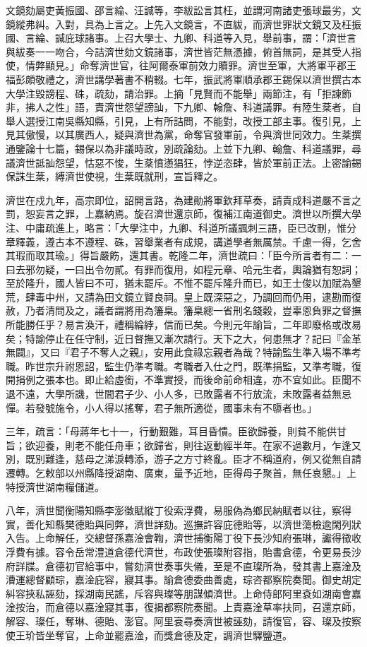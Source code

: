 \begin{pinyinscope}
文鏡劾屬吏黃振國、邵言綸、汪諴等，李紱訟言其枉，並謂河南諸吏張球最劣，文鏡縱弗糾。入對，具為上言之。上先入文鏡言，不直紱，而濟世罪狀文鏡又及枉振國、言綸、諴庇球諸事。上召大學士、九卿、科道等入見，舉前事，謂：「濟世言與紱奏一一吻合，今詰濟世劾文鏡諸事，濟世皆茫無憑據，俯首無詞，是其受人指使，情弊顯見。」命奪濟世官，往阿爾泰軍前效力贖罪。濟世至軍，大將軍平郡王福彭頗敬禮之，濟世講學著書不稍輟。七年，振武將軍順承郡王錫保以濟世撰古本大學注毀謗程、硃，疏劾，請治罪。上摘「見賢而不能舉」兩節注，有「拒諫飾非，拂人之性」語，責濟世怨望謗訕，下九卿、翰詹、科道議罪。有陸生棻者，自舉人選授江南吳縣知縣，引見，上有所詰問，不能對，改授工部主事。復引見，上見其傲慢，以其廣西人，疑與濟世為黨，命奪官發軍前，令與濟世同效力。生棻撰通鑒論十七篇，錫保以為非議時政，別疏論劾。上並下九卿、翰詹、科道議罪，尋議濟世詆訕怨望，怙惡不悛，生棻憤懣猖狂，悖逆恣肆，皆於軍前正法。上密諭錫保誅生棻，縛濟世使視，生棻既就刑，宣旨釋之。

濟世在戍九年，高宗即位，詔開言路，為建勛將軍欽拜草奏，請責成科道嚴不言之罰，恕妄言之罪，上嘉納焉。旋召濟世還京師，復補江南道御史。濟世以所撰大學注、中庸疏進上，略言：「大學注中，九卿、科道所議諷刺三語，臣已改刪，惟分章釋義，遵古本不遵程、硃，習舉業者有成規，講道學者無厲禁。千慮一得，乞舍其瑕而取其瑜。」得旨嚴飭，還其書。乾隆二年，濟世疏曰：「臣今所言者有二：一曰去邪勿疑，一曰出令勿貳。有罪而復用，如程元章、哈元生者，輿論猶有恕詞；至於隆升，國人皆曰不可，猶未罷斥。不惟不罷斥隆升而已，如王士俊以加賦為墾荒，肆毒中州，又請為田文鏡立賢良祠。皇上既深惡之，乃調回而仍用，逮勘而復赦，乃者清問及之，議者謂將用為籓臬。籓臬總一省刑名錢穀，豈辜恩負罪之督撫所能勝任乎？易言渙汗，禮稱綸綍，信而已矣。今則元年諭旨，二年即廢格或改易矣；特諭停止在任守制，近日督撫又漸次請行。天下之大，何患無才？記曰『金革無闢』，又曰『君子不奪人之親』，安用此食祿忘親者為哉？特諭監生準入場不準考職。昨世宗升祔恩詔，監生仍準考職。考職者入仕之門，既準捐監，又準考職，復開捐例之張本也。即止給虛銜，不準實授，而後命前命相違，亦不宜如此。臣聞不退不遠，大學所譏，世間君子少、小人多，已敗露者不行放流，未敗露者益無忌憚。若發號施令，小人得以搖奪，君子無所適從，國事未有不隳者也。」

三年，疏言：「母蔣年七十一，行動艱難，耳目昏憒。臣欲歸養，則貧不能供甘旨；欲迎養，則老不能任舟車；欲歸省，則往返動經半年。在家不過數月，乍逢又別，既別難逢，慈母之涕淚轉添，游子之方寸終亂。臣才不稱道府，例又從無自請遷轉。乞敕部以州縣降授湖南、廣東，量予近地，臣得母子聚首，無任哀懇。」上特授濟世湖南糧儲道。

八年，濟世聞衡陽知縣李澎徵賦縱丁役索浮費，易服偽為鄉民納賦者以往，察得實，善化知縣樊德貽與同弊，濟世詳劾。巡撫許容庇德貽等，以濟世蕩檢逾閑列狀入告。上命解任，交總督孫嘉淦會鞫，濟世捕衡陽丁役下長沙知府張琳，讞得徵收浮費有據。容令岳常澧道倉德代濟世，布政使張璨附容指，貽書倉德，令更易長沙府詳牒。倉德初官給事中，嘗劾濟世奏事失儀，至是不直璨所為，發其書上嘉淦及漕運總督顧琮，嘉淦庇容，寢其事。諭倉德委曲善處，琮咨都察院奏聞。御史胡定糾容挾私誣劾，採湖南民謠，斥容與璨等朋謀傾濟世。上命侍郎阿里袞如湖南會嘉淦按治，而倉德以嘉淦寢其事，復揭都察院奏聞。上責嘉淦草率扶同，召還京師，解容、璨任，奪琳、德貽、澎官。阿里袞尋奏濟世被誣劾，請復官，容、璨及按察使王玠皆坐奪官，上命並罷嘉淦，而獎倉德及定，調濟世驛鹽道。


\end{pinyinscope}
